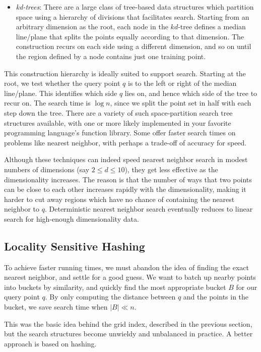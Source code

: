 \documentclass[10pt]{article}
\begin{document}
\begin{itemize}
    \item \textit{kd-trees}: There are a large class of tree-based data structures which partition space using a hierarchy of divisions that facilitates search. Starting from an arbitrary dimension as the root, each node in the $k d$-tree defines a median line/plane that splits the points equally according to that dimension. The construction recurs on each side using a different dimension, and so on until the region defined by a node contains just one training point.
\end{itemize}

This construction hierarchy is ideally suited to support search. Starting at the root, we test whether the query point $q$ is to the left or right of the median line/plane. This identifies which side $q$ lies on, and hence which side of the tree to recur on. The search time is $\log n$, since we split the point set in half with each step down the tree. There are a variety of such space-partition search tree structures available, with one or more likely implemented in your favorite programming language's function library. Some offer faster search times on problems like nearest neighbor, with perhaps a trade-off of accuracy for speed.

Although these techniques can indeed speed nearest neighbor search in modest numbers of dimensions (say $2 \leq d \leq 10$), they get less effective as the dimensionality increases. The reason is that the number of ways that two points can be close to each other increases rapidly with the dimensionality, making it harder to cut away regions which have no chance of containing the nearest neighbor to $q$. Deterministic nearest neighbor search eventually reduces to linear search for high-enough dimensionality data.

\subsection{Locality Sensitive Hashing}
To achieve faster running times, we must abandon the idea of finding the exact nearest neighbor, and settle for a good guess. We want to batch up nearby points into buckets by similarity, and quickly find the most appropriate bucket $B$ for our query point $q$. By only computing the distance between $q$ and the points in the bucket, we save search time when $|B| \ll n$.

This was the basic idea behind the grid index, described in the previous section, but the search structures become unwieldy and unbalanced in practice. A better approach is based on hashing.
\end{document}
